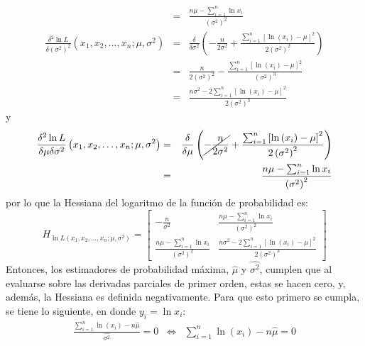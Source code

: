 \begin{solucion}
\begin{enumerate}
\begin{eqnarray*}
   & = & \frac{n\mu - \sum_{i=1}^n \ln x_i}{\left( \sigma^2 \right)^2} \\
   \frac{\delta^2 \ln L}{\delta \left( \sigma^2 \right)^2} \left( x_1, x_2, \ldots, x_n; \mu, \sigma^2 \right) & = & \frac{\delta}{\delta \sigma^2} \left( - \frac{n}{2\sigma^2} + \frac{\sum_{i=1}^n \left[ \ln\left( x_i \right) - \mu \right]^2}{2\left( \sigma^2 \right)^2} \right) \\
   & = & \frac{n}{2\left( \sigma^2 \right)^2} - \frac{\sum_{i= 1}^n \left[ \ln\left( x_i \right) - \mu \right]^2}{\left( \sigma^2 \right)^3} \\
   & = & \frac{n\sigma^2 - 2\sum_{i=1}^n \left[ \ln\left( x_i \right) - \mu \right]^2}{2\left( \sigma^2 \right)^3} 
  \end{eqnarray*}
  y
  \begin{eqnarray*}
   \frac{\delta^2 \ln L}{\delta \mu \delta \sigma^2} \left( x_1, x_2, \ldots, x_n; \mu, \sigma^2 \right) & = & \frac{\delta}{\delta \mu} \left( \cancel{ - \frac{n}{2\sigma^2} } + \frac{\sum_{i=1}^n \left[ \ln\left( x_i \right) - \mu \right]^2}{2\left( \sigma^2 \right)^2} \right) \\
   & = & \frac{n\mu - \sum_{i=1}^n \ln x_i}{\left( \sigma^2 \right)^2}
  \end{eqnarray*}
  por lo que la Hessiana del logaritmo de la funci\'on de probabilidad es:
  \begin{equation*}
   H_{\ln L \left( x_1, x_2, \ldots, x_n; \mu, \sigma^2 \right)} =
   \begin{bmatrix}
    \displaystyle{ - \frac{n}{\sigma^2} } & \displaystyle{ \frac{n\mu - \sum_{i=1}^n \ln x_i}{\left( \sigma^2 \right)^2} } \\
    \displaystyle{ \frac{n\mu - \sum_{i=1}^n \ln x_i}{\left( \sigma^2 \right)^2} } & \displaystyle{ \frac{n\sigma^2 - 2\sum_{i=1}^n \left[ \ln\left( x_i \right) - \mu \right]^2}{2\left( \sigma^2 \right)^3} }
   \end{bmatrix}
  \end{equation*}
  Entonces, los estimadores de probabilidad m\'axima, $\hat{\mu}$ y $\widehat{\sigma^2}$, cumplen que al evaluarse sobre las derivadas parciales de primer orden, estas se hacen cero, y, adem\'as, la Hessiana es definida negativamente. Para que esto primero se cumpla, se tiene lo siguiente, en donde $y_i = \ln x_i$:
  \begin{eqnarray*}
   \frac{\sum_{i=1}^n \ln\left( x_i \right) - n\hat{\mu}}{\widehat{\sigma^2}} = 0 & \Leftrightarrow & \sum_{i=1}^n \ln\left( x_i \right) - n\hat{\mu} = 0 \\

\end{eqnarray*}
\end{enumerate}
\end{solucion}
